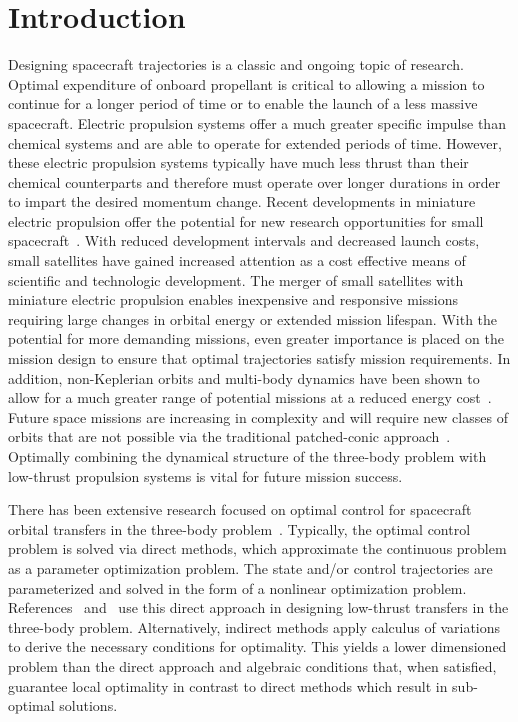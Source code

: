\documentclass[preprint]{elsarticle}
\begin{document}
\section{Introduction}\label{sec:introduction}
Designing spacecraft trajectories is a classic and ongoing topic of research.
Optimal expenditure of onboard propellant is critical to allowing a mission to continue for a longer period of time or to enable the launch of a less massive spacecraft.
Electric propulsion systems offer a much greater specific impulse than chemical systems and are able to operate for extended periods of time.
However, these electric propulsion systems typically have much less thrust than their chemical counterparts and therefore must operate over longer durations in order to impart the desired momentum change.
Recent developments in miniature electric propulsion offer the potential for new research opportunities for small spacecraft~\cite{haque2013}.
With reduced development intervals and decreased launch costs, small satellites have gained increased attention as a cost effective means of scientific and technologic development. 
The merger of small satellites with miniature electric propulsion enables inexpensive and responsive missions requiring large changes in orbital energy or extended mission lifespan.
With the potential for more demanding missions, even greater importance is placed on the mission design to ensure that optimal trajectories satisfy mission requirements. 
In addition, non-Keplerian orbits and multi-body dynamics have been shown to allow for a much greater range of potential missions at a reduced energy cost~\cite{koon2011}.
Future space missions are increasing in complexity and will require new classes of orbits that are not possible via the traditional patched-conic approach~\cite{ross2006,gomez2001}.
Optimally combining the dynamical structure of the three-body problem with low-thrust propulsion systems is vital for future mission success.

There has been extensive research focused on optimal control for spacecraft orbital transfers in the three-body problem~\cite{mingotti2011,grebow2011}.
Typically, the optimal control problem is solved via direct methods, which approximate the continuous problem as a parameter optimization problem.
The state and/or control trajectories are parameterized and solved in the form of a nonlinear optimization problem.
References~ and~ use this direct approach in designing low-thrust transfers in the three-body problem.
Alternatively, indirect methods apply calculus of variations to derive the necessary conditions for optimality. 
This yields a lower dimensioned problem than the direct approach and algebraic conditions that, when satisfied, guarantee local optimality in contrast to direct methods which result in sub-optimal solutions.
\end{document}
